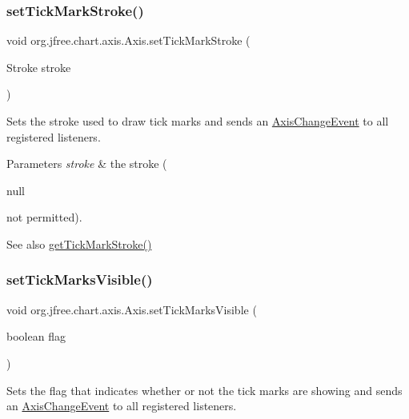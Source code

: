 \subsubsection{\texorpdfstring{set\+Tick\+Mark\+Stroke()}{setTickMarkStroke()}}
{\footnotesize\ttfamily void org.\+jfree.\+chart.\+axis.\+Axis.\+set\+Tick\+Mark\+Stroke (\begin{DoxyParamCaption}\item[{Stroke}]{stroke }\end{DoxyParamCaption})}

Sets the stroke used to draw tick marks and sends an \mbox{\hyperlink{}{Axis\+Change\+Event}} to all registered listeners.


\begin{DoxyParams}{Parameters}
{\em stroke} & the stroke (
\begin{DoxyCode}
null 
\end{DoxyCode}
 not permitted).\\
\hline
\end{DoxyParams}
\begin{DoxySeeAlso}{See also}
\mbox{\hyperlink{classorg_1_1jfree_1_1chart_1_1axis_1_1_axis_a2d8786d95acfa7706629df7e96b2a2b1}{get\+Tick\+Mark\+Stroke()}} 
\end{DoxySeeAlso}
\mbox{\label{classorg_1_1jfree_1_1chart_1_1axis_1_1_axis_ae042728f9c85c4614720a84df73b50bb}} 
\subsubsection{\texorpdfstring{set\+Tick\+Marks\+Visible()}{setTickMarksVisible()}}
{\footnotesize\ttfamily void org.\+jfree.\+chart.\+axis.\+Axis.\+set\+Tick\+Marks\+Visible (\begin{DoxyParamCaption}\item[{boolean}]{flag }\end{DoxyParamCaption})}

Sets the flag that indicates whether or not the tick marks are showing and sends an \mbox{\hyperlink{}{Axis\+Change\+Event}} to all registered listeners.


